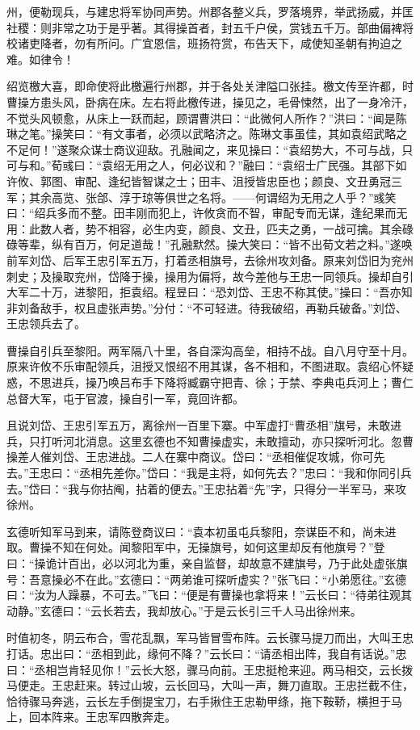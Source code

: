 州，便勒现兵，与建忠将军协同声势。州郡各整义兵，罗落境界，举武扬威，并匡社稷：则非常之功于是乎著。其得操首者，封五千户侯，赏钱五千万。部曲偏裨将校诸吏降者，勿有所问。广宜恩信，班扬符赏，布告天下，咸使知圣朝有拘迫之难。如律令！

绍览檄大喜，即命使将此檄遍行州郡，并于各处关津隘口张挂。檄文传至许都，时曹操方患头风，卧病在床。左右将此檄传进，操见之，毛骨悚然，出了一身冷汗，不觉头风顿愈，从床上一跃而起，顾谓曹洪曰：“此微何人所作？”洪曰：“闻是陈琳之笔。”操笑曰：“有文事者，必须以武略济之。陈琳文事虽佳，其如袁绍武略之不足何！”遂聚众谋士商议迎敌。孔融闻之，来见操曰：“袁绍势大，不可与战，只可与和。”荀彧曰：“袁绍无用之人，何必议和？”融曰：“袁绍士广民强。其部下如许攸、郭图、审配、逢纪皆智谋之士；田丰、沮授皆忠臣也；颜良、文丑勇冠三军；其余高览、张郃、淳于琼等俱世之名将。——何谓绍为无用之人乎？”彧笑曰：“绍兵多而不整。田丰刚而犯上，许攸贪而不智，审配专而无谋，逢纪果而无用：此数人者，势不相容，必生内变，颜良、文丑，匹夫之勇，一战可擒。其余碌碌等辈，纵有百万，何足道哉！”孔融默然。操大笑曰：“皆不出荀文若之料。”遂唤前军刘岱、后军王忠引军五万，打着丞相旗号，去徐州攻刘备。原来刘岱旧为兖州刺史；及操取兖州，岱降于操，操用为偏将，故今差他与王忠一同领兵。操却自引大军二十万，进黎阳，拒袁绍。程昱曰：“恐刘岱、王忠不称其使。”操曰：“吾亦知非刘备敌手，权且虚张声势。”分付：“不可轻进。待我破绍，再勒兵破备。”刘岱、王忠领兵去了。

曹操自引兵至黎阳。两军隔八十里，各自深沟高垒，相持不战。自八月守至十月。原来许攸不乐审配领兵，沮授又恨绍不用其谋，各不相和，不图进取。袁绍心怀疑惑，不思进兵，操乃唤吕布手下降将臧霸守把青、徐；于禁、李典屯兵河上；曹仁总督大军，屯于官渡，操自引一军，竟回许都。

且说刘岱、王忠引军五万，离徐州一百里下寨。中军虚打“曹丞相”旗号，未敢进兵，只打听河北消息。这里玄德也不知曹操虚实，未敢擅动，亦只探听河北。忽曹操差人催刘岱、王忠进战。二人在寨中商议。岱曰：“丞相催促攻城，你可先去。”王忠曰：“丞相先差你。”岱曰：“我是主将，如何先去？”忠曰：“我和你同引兵去。”岱曰：“我与你拈阄，拈着的便去。”王忠拈着“先”字，只得分一半军马，来攻徐州。

玄德听知军马到来，请陈登商议曰：“袁本初虽屯兵黎阳，奈谋臣不和，尚未进取。曹操不知在何处。闻黎阳军中，无操旗号，如何这里却反有他旗号？”登曰：“操诡计百出，必以河北为重，亲自监督，却故意不建旗号，乃于此处虚张旗号：吾意操必不在此。”玄德曰：“两弟谁可探听虚实？”张飞曰：“小弟愿往。”玄德曰：“汝为人躁暴，不可去。”飞曰：“便是有曹操也拿将来！”云长曰：“待弟往观其动静。”玄德曰：“云长若去，我却放心。”于是云长引三千人马出徐州来。

时值初冬，阴云布合，雪花乱飘，军马皆冒雪布阵。云长骤马提刀而出，大叫王忠打话。忠出曰：“丞相到此，缘何不降？”云长曰：“请丞相出阵，我自有话说。”忠曰：“丞相岂肯轻见你！”云长大怒，骤马向前。王忠挺枪来迎。两马相交，云长拨马便走。王忠赶来。转过山坡，云长回马，大叫一声，舞刀直取。王忠拦截不住，恰待骤马奔逃，云长左手倒提宝刀，右手揪住王忠勒甲绦，拖下鞍鞒，横担于马上，回本阵来。王忠军四散奔走。

